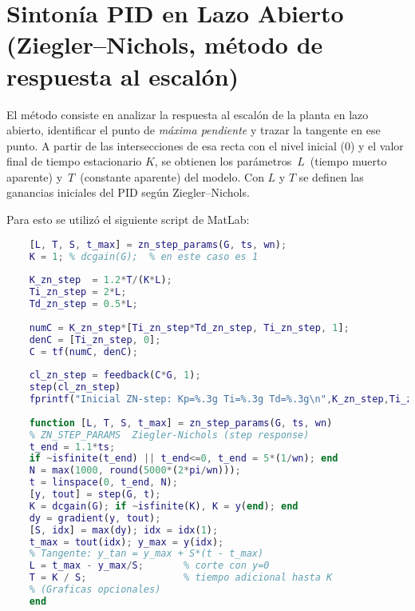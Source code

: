 \twocolumn
\section{Sintonía PID en Lazo Abierto (Ziegler--Nichols, método de respuesta al escalón)}

El método consiste en analizar la respuesta al escalón de la planta en lazo abierto, identificar el punto de \emph{máxima pendiente} y trazar la tangente en ese punto. A partir de las intersecciones de esa recta con el nivel inicial (0) y el valor final de tiempo estacionario \(K\), se obtienen los parámetros \(\,L\,\) (tiempo muerto aparente) y \(\,T\,\) (constante aparente) del modelo. Con \(L\) y \(T\) se definen las ganancias iniciales del PID según Ziegler--Nichols.

Para esto se utilizó el siguiente script de MatLab:


\begin{strip}
	\vspace{-\baselineskip} %
	\noindent
	\begin{minipage}{0.98\textwidth}

\begin{lstlisting}[language=Matlab,style = matlabstyle, caption={ZN por respuesta al escalon: extraccion de L y T y calculo de PID}, label={lst:zn_step}, frame=single]
	% ======= Step Response Method (ZN) =======
	[L, T, S, t_max] = zn_step_params(G, ts, wn);
	K = 1; % dcgain(G);  % en este caso es 1
	
	K_zn_step  = 1.2*T/(K*L);
	Ti_zn_step = 2*L;
	Td_zn_step = 0.5*L;
	
	numC = K_zn_step*[Ti_zn_step*Td_zn_step, Ti_zn_step, 1];
	denC = [Ti_zn_step, 0];
	C = tf(numC, denC);
	
	cl_zn_step = feedback(C*G, 1);
	step(cl_zn_step)
	fprintf("Inicial ZN-step: Kp=%.3g Ti=%.3g Td=%.3g\n",K_zn_step,Ti_zn_step,Td_zn_step);
	
	function [L, T, S, t_max] = zn_step_params(G, ts, wn)
	% ZN_STEP_PARAMS  Ziegler-Nichols (step response)
	t_end = 1.1*ts;
	if ~isfinite(t_end) || t_end<=0, t_end = 5*(1/wn); end
	N = max(1000, round(5000*(2*pi/wn)));
	t = linspace(0, t_end, N);
	[y, tout] = step(G, t);
	K = dcgain(G); if ~isfinite(K), K = y(end); end
	dy = gradient(y, tout);
	[S, idx] = max(dy); idx = idx(1);
	t_max = tout(idx); y_max = y(idx);
	% Tangente: y_tan = y_max + S*(t - t_max)
	L = t_max - y_max/S;       % corte con y=0
	T = K / S;                 % tiempo adicional hasta K
	% (Graficas opcionales)
	end
\end{lstlisting}

\end{minipage}
\vspace{-\baselineskip} %
\end{strip}

